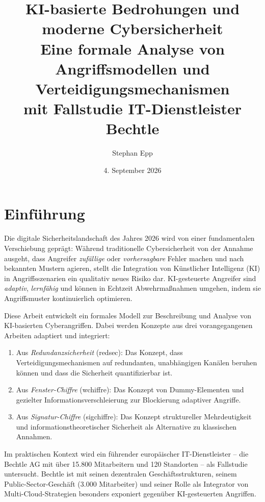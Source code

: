 \documentclass[a4paper,12pt]{article}
\title{\textbf{KI-basierte Bedrohungen und \\moderne Cybersicherheit}\\
Eine formale Analyse von Angriffsmodellen und Verteidigungsmechanismen\\
mit Fallstudie IT-Dienstleister Bechtle}
\author{Stephan Epp}
\date{4. September 2026}
\theoremstyle{definition}
\begin{document}
\maketitle

\tableofcontents
\newpage

\section{Einführung}

Die digitale Sicherheitslandschaft des Jahres 2026 wird von einer fundamentalen Verschiebung geprägt: Während traditionelle Cybersicherheit von der Annahme ausgeht, dass Angreifer \emph{zufällige} oder \emph{vorhersagbare} Fehler machen und nach bekannten Mustern agieren, stellt die Integration von Künstlicher Intelligenz (KI) in Angriffsszenarien ein qualitativ neues Risiko dar. KI-gesteuerte Angreifer sind \emph{adaptiv}, \emph{lernfähig} und können in Echtzeit Abwehrmaßnahmen umgehen, indem sie Angriffsmuster kontinuierlich optimieren.

Diese Arbeit entwickelt ein formales Modell zur Beschreibung und Analyse von KI-basierten Cyberangriffen. Dabei werden Konzepte aus drei vorangegangenen Arbeiten adaptiert und integriert:

\begin{enumerate}
	\item Aus \emph{Redundanzsicherheit} (redsec): Das Konzept, dass Verteidigungsmechanismen auf redundanten, unabhängigen Kanälen beruhen können und dass die Sicherheit quantifizierbar ist.
	\item Aus \emph{Fenster-Chiffre} (wchiffre): Das Konzept von Dummy-Elementen und gezielter Informationsverschleierung zur Blockierung adaptiver Angriffe.
	\item Aus \emph{Signatur-Chiffre} (sigchiffre): Das Konzept struktureller Mehrdeutigkeit und informationstheoretischer Sicherheit als Alternative zu klassischen Annahmen.
\end{enumerate}

Im praktischen Kontext wird ein führender europäischer IT-Dienstleister -- die Bechtle AG mit über 15.800 Mitarbeitern und 120 Standorten -- als Fallstudie untersucht. Bechtle ist mit seinen dezentralen Geschäftsstrukturen, seinem Public-Sector-Geschäft (3.000 Mitarbeiter) und seiner Rolle als Integrator von Multi-Cloud-Strategien besonders exponiert gegenüber KI-gesteuerten Angriffen.
\end{document}
